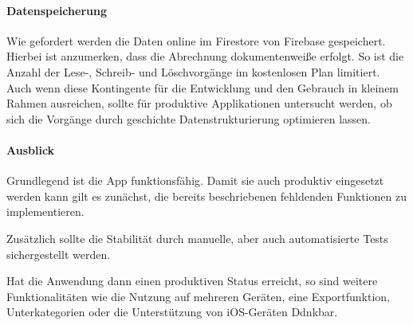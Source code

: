 \paragraph{Datenspeicherung}
Wie gefordert werden die Daten online im Firestore von Firebase gespeichert.
Hierbei ist anzumerken, dass die Abrechnung dokumentenweiße erfolgt.
So ist die Anzahl der Lese-, Schreib- und Löschvorgänge im kostenlosen Plan limitiert.
Auch wenn diese Kontingente für die Entwicklung und den Gebrauch in kleinem Rahmen ausreichen,
sollte für produktive Applikationen untersucht werden,
ob sich die Vorgänge durch geschichte Datenstrukturierung optimieren lassen.

\paragraph{Ausblick}
Grundlegend ist die App funktionsfähig.
Damit sie auch produktiv eingesetzt werden kann gilt es zunächst,
die bereits beschriebenen fehldenden Funktionen zu implementieren.

Zusätzlich sollte die Stabilität durch manuelle,
aber auch automatisierte Tests sichergestellt werden.

Hat die Anwendung dann einen produktiven Status erreicht,
so sind weitere Funktionalitäten wie die Nutzung auf mehreren Geräten, eine Exportfunktion,
Unterkategorien oder die Unterstützung von iOS-Geräten Ddnkbar.
